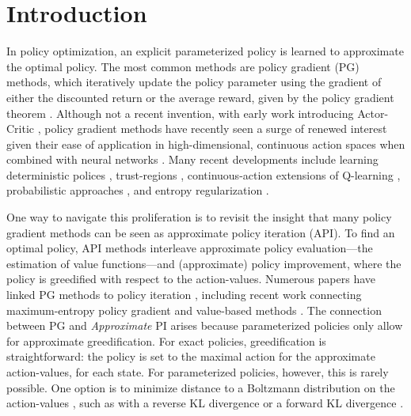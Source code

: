 \documentclass[twoside,11pt]{article}
\begin{document}
\section{Introduction}
In policy optimization, an explicit parameterized policy is learned to approximate the optimal policy. The most common methods are policy gradient (PG) methods, which iteratively update the policy parameter using the gradient of either the discounted return or the average reward, given by the {policy gradient theorem} \citep{sutton2000policy}.
Although not a recent invention, with early work introducing Actor-Critic \citep{sutton1984}, policy gradient methods have recently seen a surge of renewed interest given their ease of application in high-dimensional, continuous action spaces when combined with neural networks \citep{schulman2015high,wang2016sample}. Many recent developments include learning deterministic polices \citep{silver2014deterministic,lillicrap2015continuous}, trust-regions \citep{schulman2015trust,schulman2017proximal}, continuous-action extensions of Q-learning \citep{ haarnoja2017reinforcement,lim2018actor,ryu2019caql}, probabilistic approaches \citep{abdolmaleki2018maximum,fellows2019virel}, and entropy regularization \citep{haarnoja2017reinforcement, haarnoja2018soft}.

One way to navigate this proliferation is to revisit the insight that many policy gradient methods can be seen as approximate policy iteration (API). To find an optimal policy, API methods \citep{bertsekas2011approximate,scherrer2014approximate} interleave approximate policy evaluation---the estimation of value functions---and (approximate) policy improvement, where the policy is greedified with respect to the action-values. Numerous papers have linked PG methods to policy iteration \citep{sutton2000policy,kakade2002approximately,perkins2002existence,perkins2003convergent,wagner2011reinterpretation,wagner2013optimistic,scherrer2014local,bhandari2019global}, including recent work connecting maximum-entropy policy gradient and value-based methods \citep{o2016combining,nachum2017bridging, schulman2017equivalence, nachum2019algaedice}.
The connection between PG and \emph{Approximate} PI arises because parameterized policies only allow for approximate greedification. For exact policies, greedification is straightforward: the policy is set to the maximal action for the approximate action-values, for each state. 
For parameterized policies, however, this is rarely possible. One option is to minimize distance to a Boltzmann distribution on the action-values \citep{wagner2011reinterpretation}, such as with a reverse KL divergence \citep{haarnoja2018soft} or a forward KL divergence \citep{vieillard2019deep}.
\end{document}
